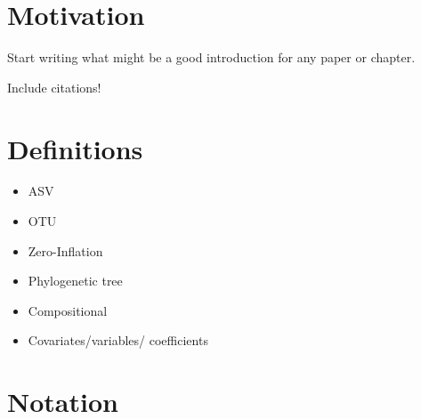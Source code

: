 \documentclass[10pt]{article}
\theoremstyle{definition}
\begin{document}
\tableofcontents

\newpage

\section{Motivation}

Start writing what might be a good introduction for any paper or chapter.

Include citations!

\section{Definitions}

\begin{itemize}
  \item ASV
  \item OTU
  \item Zero-Inflation
  \item Phylogenetic tree
  \item Compositional
  \item Covariates/variables/ coefficients
\end{itemize}

\section{Notation}
\end{document}
